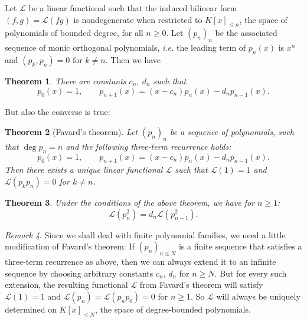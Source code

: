 \documentclass{amsart}
\newcommand{\ie}{{\it i.e. }}
\renewcommand{\L}{\mathcal{L}}
\theoremstyle{plain}
\newtheorem{theorem}{Theorem}[section]
\theoremstyle{definition}
\theoremstyle{remark}
\newtheorem{remark}[theorem]{Remark}
\begin{document}
Let $\L$ be a linear functional such that the induced bilinear form $(f,g)=\L(fg)$ is nondegenerate when restricted to $K[x]_{\leq n}$, the space of polynomials of bounded degree, for all $n\geq 0$. Let $(p_n)_n$ be the associated sequence of monic orthogonal polynomials, \ie the leading term of $p_n(x)$ is $x^n$ and $(p_k,p_{n})=0$ for $k\neq n$. Then we have
\begin{theorem} \cite[Thm.~4.1]{Chihara} There are constants $c_n,\: d_n$ such that
\begin{equation*}
 p_0(x) = 1,\qquad  p_{n+1}(x) = (x-c_n)p_n(x) - d_np_{n-1}(x).
\end{equation*}
\end{theorem}
But also the converse is true:
\begin{theorem}[Favard's theorem] \cite[Thm.~4.4]{Chihara} \label{favard}
Let $(p_n)_n$ be a sequence of polynomials, such that $\deg p_n =n$ and the following three-term recurrence holds:
$$p_0(x) = 1,\qquad  p_{n+1}(x) = (x-c_n)p_n(x) - d_np_{n-1}(x).
$$
Then there exists a unique linear functional $\L$ such that $\L(1)=1$ and $\L(p_kp_{n})=0$ for $k\neq n$. 
\end{theorem}
\begin{theorem}\cite[Thm.~4.2]{Chihara} \label{generalLnorm}
Under the conditions of the above theorem, we have for $n\geq 1$: $$\L(p_n^2) = d_n\L(p_{n-1}^2).$$
\end{theorem}
\begin{remark} \label{finiteFarvard}Since we shall deal with finite polynomial families, we need a little modification of Favard's theorem:
If $(p_n)_{n\leq N}$ is a finite sequence that satisfies a three-term recurrence as above, then we can always extend it to an infinite sequence by choosing arbitrary constants $c_n$, $d_n$ for $n\geq N$. But for every such extension, the resulting functional $\L$ from Favard's theorem will satisfy $\L(1) =1$ and $\L(p_n)=\L(p_np_0)=0$ for $n\geq 1$. So $\L$ will always be uniquely determined on $K[x]_{\leq N}$, the space of degree-bounded polynomials.
\end{remark}
\end{document}
